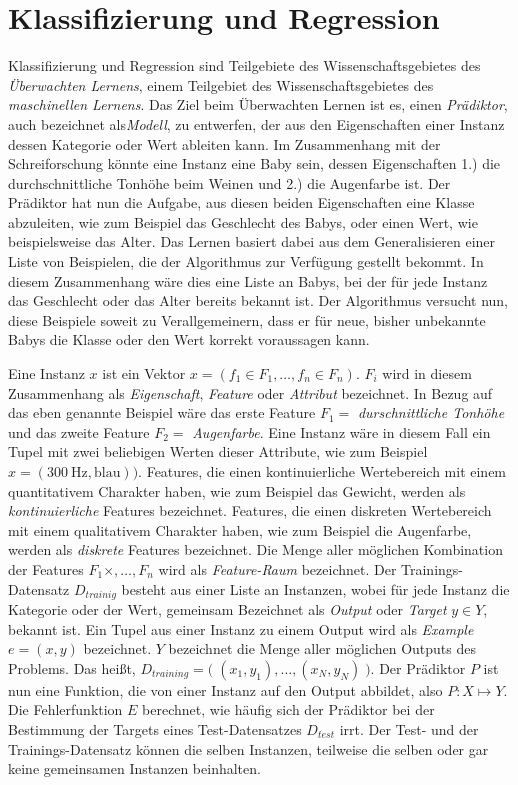 \section{Klassifizierung und Regression}
\label{sec:learning}

Klassifizierung und Regression sind Teilgebiete des Wissenschaftsgebietes des \emph{Überwachten Lernens}, einem Teilgebiet des Wissenschaftsgebietes des \emph{maschinellen Lernens}. Das Ziel beim Überwachten Lernen ist es, einen \emph{Prädiktor}, auch bezeichnet als\emph{Modell}, zu entwerfen, der aus den Eigenschaften einer Instanz dessen Kategorie oder Wert ableiten kann. Im Zusammenhang mit der Schreiforschung könnte eine Instanz eine Baby sein, dessen Eigenschaften 1.) die durchschnittliche Tonhöhe beim Weinen und 2.) die Augenfarbe ist. Der Prädiktor hat nun die Aufgabe, aus diesen beiden Eigenschaften eine Klasse abzuleiten, wie zum Beispiel das Geschlecht des Babys, oder einen Wert, wie beispielsweise das Alter. Das Lernen basiert dabei aus dem Generalisieren einer Liste von Beispielen, die der Algorithmus zur Verfügung gestellt bekommt. In diesem Zusammenhang wäre dies eine Liste an Babys, bei der für jede Instanz das Geschlecht oder das Alter bereits bekannt ist. Der Algorithmus versucht nun, diese Beispiele soweit zu Verallgemeinern, dass er für neue, bisher unbekannte Babys die Klasse oder den Wert korrekt voraussagen kann.\cite[S. 6 - 7]{machine_marsland}

Eine Instanz $x$ ist ein Vektor $x = ( f_1 \in F_1 , \ldots , f_n \in F_n )$. $F_i$ wird in diesem Zusammenhang als \emph{Eigenschaft}, \emph{Feature} oder \emph{Attribut} bezeichnet. In Bezug auf das eben genannte Beispiel wäre das erste Feature $F_1 = $ \emph{durschnittliche Tonhöhe} und das zweite Feature $F_2 = $ \emph{Augenfarbe}. Eine Instanz wäre in diesem Fall ein Tupel mit zwei beliebigen Werten dieser Attribute, wie zum Beispiel $x = ( \SI{300}{\hertz}, \text{blau}) )$. Features, die einen kontinuierliche Wertebereich mit einem quantitativem Charakter haben, wie zum Beispiel das Gewicht, werden als \emph{kontinuierliche} Features bezeichnet. Features, die einen diskreten Wertebereich mit einem qualitativem Charakter haben, wie zum Beispiel die Augenfarbe, werden als \emph{diskrete} Features bezeichnet.  Die Menge aller möglichen Kombination der Features $F_1 \times , \ldots , F_n$ wird als \emph{Feature-Raum} bezeichnet. Der Trainings-Datensatz $D_{trainig}$ besteht aus einer Liste an Instanzen, wobei für jede Instanz die Kategorie oder der Wert, gemeinsam Bezeichnet als \emph{Output} oder \emph{Target} $y \in Y$, bekannt ist. Ein Tupel aus einer Instanz zu einem Output wird als \emph{Example} $e =(x,y)$ bezeichnet. $Y$ bezeichnet die Menge aller möglichen Outputs des Problems. Das heißt, $D_{training} = \big( \; (x_1, y_1), \ldots , (x_N, y_N) \; \big)$. Der Prädiktor $P$ ist nun eine Funktion, die von einer Instanz auf den Output abbildet, also $P: X \mapsto Y$. Die Fehlerfunktion $E$ berechnet, wie häufig sich der Prädiktor bei der Bestimmung der Targets eines Test-Datensatzes $D_{test}$ irrt. Der Test- und der Trainings-Datensatz können die selben Instanzen, teilweise die selben oder gar keine gemeinsamen Instanzen beinhalten.\cite[S. 6 - 7, 18 - 19]{machine_marsland} \cite[S. 8 - 9]{learning_cart_dobra} 

